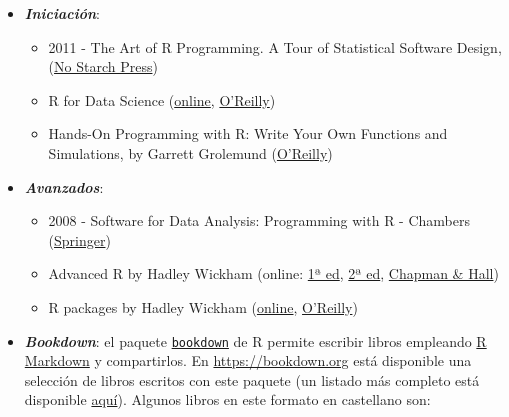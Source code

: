 \documentclass[]{book}
\theoremstyle{definition}
\theoremstyle{definition}
\theoremstyle{definition}
\theoremstyle{remark}
\begin{document}
\begin{itemize}
\item
  \textbf{\emph{Iniciación}}:

  \begin{itemize}
  \item
    2011 - The Art of R Programming. A Tour of Statistical Software
    Design, (\href{https://www.nostarch.com/artofr.htm}{No Starch
    Press})
  \item
    R for Data Science (\href{http://r4ds.had.co.nz/}{online},
    \href{http://shop.oreilly.com/product/0636920034407.do}{O'Reilly})
  \item
    Hands-On Programming with R: Write Your Own Functions and
    Simulations, by Garrett Grolemund
    (\href{http://shop.oreilly.com/product/0636920028574.do}{O'Reilly})
  \end{itemize}
\item
  \textbf{\emph{Avanzados}}:

  \begin{itemize}
  \item
    2008 - Software for Data Analysis: Programming with R - Chambers
    (\href{http://www.springer.com/la/book/9780387759357}{Springer})
  \item
    Advanced R by Hadley Wickham (online:
    \href{http://adv-r.had.co.nz/}{1ª ed},
    \href{https://adv-r.hadley.nz/}{2ª ed},
    \href{https://www.amazon.com/dp/1466586966}{Chapman \& Hall})
  \item
    R packages by Hadley Wickham
    (\href{http://r-pkgs.had.co.nz/}{online},
    \href{http://shop.oreilly.com/product/0636920034421.do}{O'Reilly})
  \end{itemize}
\item
  \textbf{\emph{Bookdown}}: el paquete
  \href{https://bookdown.org}{\texttt{bookdown}} de R permite escribir
  libros empleando \href{http://rmarkdown.rstudio.com}{R Markdown} y
  compartirlos. En \url{https://bookdown.org} está disponible una
  selección de libros escritos con este paquete (un listado más completo
  está disponible \href{https://bookdown.org/home/archive/}{aquí}).
  Algunos libros en este formato en castellano son:


\end{itemize}
\end{document}
